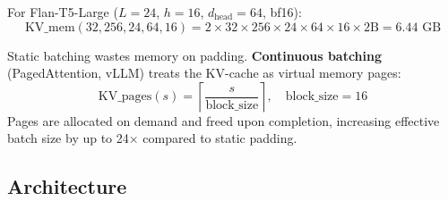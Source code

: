 \documentclass[11pt, a4paper]{article}
\begin{document}
For Flan-T5-Large ($L=24$, $h=16$, $d_{\text{head}}=64$, bf16):
\begin{equation}
\text{KV\_mem}(32, 256, 24, 64, 16) = 2 \times 32 \times 256 \times 24 \times 64 \times 16 \times 2\text{B} = 6.44\text{ GB}
\end{equation}

\begin{warningbox}
Static batching wastes memory on padding. \textbf{Continuous batching} (PagedAttention, vLLM) treats the KV-cache as virtual memory pages:
\begin{equation}
\text{KV\_pages}(s) = \left\lceil \frac{s}{\text{block\_size}} \right\rceil, \quad \text{block\_size} = 16
\end{equation}
Pages are allocated on demand and freed upon completion, increasing effective batch size by up to 24$\times$ compared to static padding.
\end{warningbox}

\subsection{Architecture}
\end{document}
